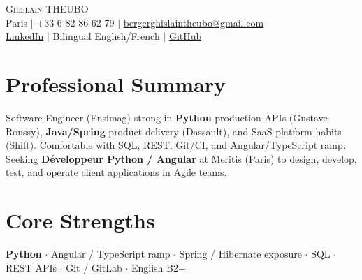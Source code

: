 \documentclass[letterpaper,10.5pt]{article}
\begin{document}
\begin{center}
{\Huge \scshape Ghislain THEUBO} \\ \vspace{2pt}
\small Paris $|$ +33 6 82 86 62 79 $|$ \href{mailto:bergerghislaintheubo@gmail.com}{bergerghislaintheubo@gmail.com} \\
\href{https://www.linkedin.com/in/berger-ghislain}{LinkedIn} $|$ Bilingual English/French $|$ \href{https://github.com/Bergerghislain}{GitHub}
\end{center}
\vspace{-6pt}
\section{Professional Summary}
\small{Software Engineer (Ensimag) strong in \textbf{Python} production APIs (Gustave Roussy), \textbf{Java/Spring} product delivery (Dassault), and SaaS platform habits (Shift). Comfortable with SQL, REST, Git/CI, and Angular/TypeScript ramp. Seeking \textbf{D\'eveloppeur Python / Angular} at Meritis (Paris) to design, develop, test, and operate client applications in Agile teams.}
\section{Core Strengths}
\small{\textbf{Python} $\cdot$ Angular / TypeScript ramp $\cdot$ Spring / Hibernate exposure $\cdot$ SQL $\cdot$ REST APIs $\cdot$ Git / GitLab $\cdot$ English B2+}
\end{document}
